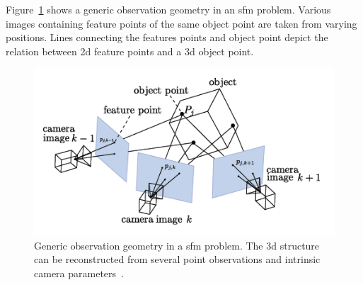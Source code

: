 Figure~\ref{fig:sfm_geometry} shows a generic observation geometry in an \gls{sfm} problem. Various images containing feature points of the same object point are taken from varying positions. Lines connecting the features points and object point depict the relation between \gls{2d} feature points and a \gls{3d} object point. 

\begin{figure}[htb]
    \centering
    \includegraphics[width=\textwidth]{doc/thesis/0_figures/sfm/sfm_geometry.png}
    \caption{Generic observation geometry in a \gls{sfm} problem. The \gls{3d} structure can be reconstructed from several point observations and intrinsic camera parameters~\cite{OpenMVGSfm}.}
    \label{fig:sfm_geometry}
\end{figure}

